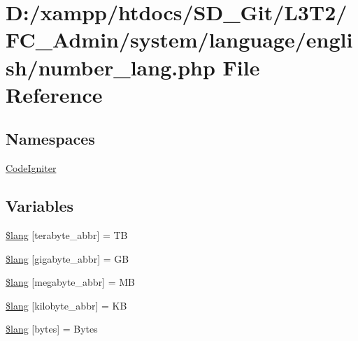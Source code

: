 \hypertarget{_admin_2system_2language_2english_2number__lang_8php}{}\section{D\+:/xampp/htdocs/\+S\+D\+\_\+\+Git/\+L3\+T2/\+F\+C\+\_\+\+Admin/system/language/english/number\+\_\+lang.php File Reference}
\label{_admin_2system_2language_2english_2number__lang_8php}
\subsection*{Namespaces}
\begin{DoxyCompactItemize}
\item 
 \hyperlink{namespace_code_igniter}{Code\+Igniter}
\end{DoxyCompactItemize}
\subsection*{Variables}
\begin{DoxyCompactItemize}
\item 
\hyperlink{_admin_2system_2language_2english_2number__lang_8php_a72963402ca792afbae1ba34a4050fcde}{\$lang} \mbox{[}\textquotesingle{}terabyte\+\_\+abbr\textquotesingle{}\mbox{]} = \textquotesingle{}T\+B\textquotesingle{}
\item 
\hyperlink{_admin_2system_2language_2english_2number__lang_8php_a2349e7364cbc6402c44bd135b132d9d6}{\$lang} \mbox{[}\textquotesingle{}gigabyte\+\_\+abbr\textquotesingle{}\mbox{]} = \textquotesingle{}G\+B\textquotesingle{}
\item 
\hyperlink{_admin_2system_2language_2english_2number__lang_8php_ae1fdf8fb2977ddec5fd9f2237f277edc}{\$lang} \mbox{[}\textquotesingle{}megabyte\+\_\+abbr\textquotesingle{}\mbox{]} = \textquotesingle{}M\+B\textquotesingle{}
\item 
\hyperlink{_admin_2system_2language_2english_2number__lang_8php_a78200289bbf44dce8b0d5f06072379e6}{\$lang} \mbox{[}\textquotesingle{}kilobyte\+\_\+abbr\textquotesingle{}\mbox{]} = \textquotesingle{}K\+B\textquotesingle{}
\item 
\hyperlink{_admin_2system_2language_2english_2number__lang_8php_aeec8ade1229052ff8627a350480bba9c}{\$lang} \mbox{[}\textquotesingle{}bytes\textquotesingle{}\mbox{]} = \textquotesingle{}Bytes\textquotesingle{}
\end{DoxyCompactItemize}



